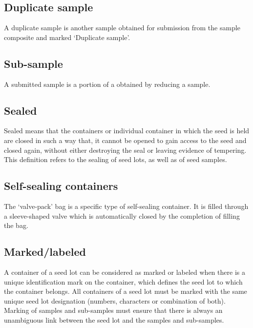 \documentclass[]{book}
\begin{document}
\subsection{Duplicate sample}\label{duplicate-sample}

A duplicate sample is another sample obtained for submission from the
sample composite and marked `Duplicate sample'.

\subsection{Sub-sample}\label{sub-sample}

A submitted sample is a portion of a obtained by reducing a sample.

\subsection{Sealed}\label{sealed}

Sealed means that the containers or individual container in which the
seed is held are closed in such a way that, it cannot be opened to gain
access to the seed and closed again, without either destroying the seal
or leaving evidence of tempering. This definition refers to the sealing
of seed lots, as well as of seed samples.

\subsection{Self-sealing containers}\label{self-sealing-containers}

The `valve-pack' bag is a specific type of self-sealing container. It is
filled through a sleeve-shaped valve which is automatically closed by
the completion of filling the bag.

\subsection{Marked/labeled}\label{markedlabeled}

A container of a seed lot can be considered as marked or labeled when
there is a unique identification mark on the container, which defines
the seed lot to which the container belongs. All containers of a seed
lot must be marked with the same unique seed lot designation (numbers,
characters or combination of both). Marking of samples and sub-samples
must ensure that there is always an unambiguous link between the seed
lot and the samples and sub-samples.
\end{document}
